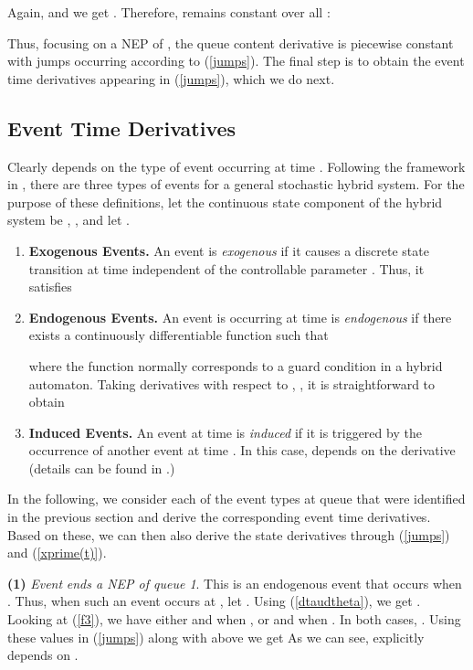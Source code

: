 \documentclass{ifacconf}\usepackage{graphicx}
\begin{document}
Again,  and we get .
Therefore,  remains constant over all :

Thus, focusing on a NEP of , the queue content derivative is
piecewise constant with jumps occurring according to (\ref{jumps}). The final
step is to obtain the event time derivatives  appearing
in (\ref{jumps}), which we do next.

\subsection{Event Time Derivatives}

Clearly  depends on the type of event occurring at time
. Following the framework in \cite{Cassandras10}, there are three
types of events for a general stochastic hybrid system. For the purpose of
these definitions, let the continuous state component of the hybrid system be
, ,
and let .

\begin{enumerate}
\item \textbf{Exogenous Events.} An event is \emph{exogenous} if it causes a
discrete state transition at time  independent of the controllable
parameter . Thus, it satisfies



\item \textbf{Endogenous Events.} An event is occurring at time  is
\emph{endogenous} if there exists a continuously differentiable function
 such that

where the function  normally corresponds to a guard condition in a
hybrid automaton. Taking derivatives with respect to ,
, it is straightforward to obtain



\item \textbf{Induced Events.} An event at time  is \emph{induced}
if it is triggered by the occurrence of another event at time . In this case,  depends on the derivative
 (details can be found in \cite{Cassandras10}.)
\end{enumerate}

In the following, we consider each of the event types at queue  that were
identified in the previous section and derive the corresponding event time
derivatives. Based on these, we can then also derive the state derivatives
through (\ref{jumps}) and (\ref{xprime(t)}).

\textbf{(1)} \emph{Event }\emph{ ends a NEP of queue 1}. This is an
endogenous event that occurs when . Thus, when such an
event occurs at , let .
Using (\ref{dtaudtheta}), we get . Looking at (\ref{f3}), we have
either  and
 when
, or  and
 when . In
both cases, . Using these values in (\ref{jumps}) along
with  above we get
As we can see,  explicitly depends on
.
\end{document}
